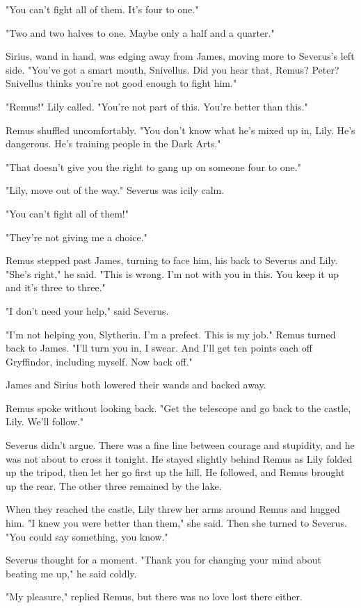 "You can't fight all of them. It's four to one."

"Two and two halves to one. Maybe only a half and a quarter."

Sirius, wand in hand, was edging away from James, moving more to Severus's left side. "You've got a smart mouth, Snivellus. Did you hear that, Remus? Peter? Snivellus thinks you're not good enough to fight him."

"Remus!" Lily called. "You're not part of this. You're better than this."

Remus shuffled uncomfortably. "You don't know what he's mixed up in, Lily. He's dangerous. He's training people in the Dark Arts."

"That doesn't give you the right to gang up on someone four to one."

"Lily, move out of the way." Severus was icily calm.

"You can't fight all of them!"

"They're not giving me a choice."

Remus stepped past James, turning to face him, his back to Severus and Lily. "She's right," he said. "This is wrong. I'm not with you in this. You keep it up and it's three to three."

"I don't need your help," said Severus.

"I'm not helping you, Slytherin. I'm a prefect. This is my job." Remus turned back to James. "I'll turn you in, I swear. And I'll get ten points each off Gryffindor, including myself. Now back off."

James and Sirius both lowered their wands and backed away.

Remus spoke without looking back. "Get the telescope and go back to the castle, Lily. We'll follow."

Severus didn't argue. There was a fine line between courage and stupidity, and he was not about to cross it tonight. He stayed slightly behind Remus as Lily folded up the tripod, then let her go first up the hill. He followed, and Remus brought up the rear. The other three remained by the lake.

When they reached the castle, Lily threw her arms around Remus and hugged him. "I knew you were better than them," she said. Then she turned to Severus. "You could say something, you know."

Severus thought for a moment. "Thank you for changing your mind about beating me up," he said coldly.

"My pleasure," replied Remus, but there was no love lost there either.

